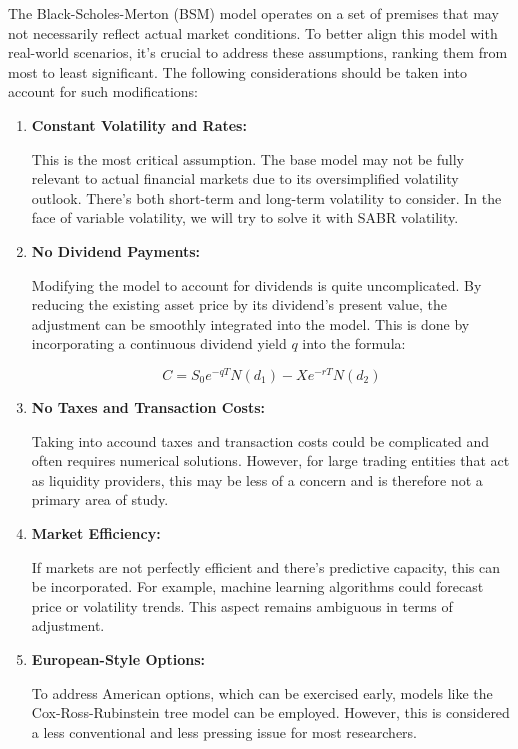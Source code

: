 \documentclass[a4paper,fleqn,12pt]{extarticle}
\begin{document}
	The Black-Scholes-Merton (BSM) model operates on a set of premises that may not necessarily reflect actual market conditions. To better align this model with real-world scenarios, it's crucial to address these assumptions, ranking them from most to least significant. The following considerations should be taken into account for such modifications:
	
	\begin{enumerate}
		\item \textbf{Constant Volatility and Rates:}
		
		This is the most critical assumption. The base model may not be fully relevant to actual financial markets due to its oversimplified volatility outlook. There's both short-term and long-term volatility to consider. In the face of variable volatility, we will try to solve it with SABR volatility.
		
		\item \textbf{No Dividend Payments:}
		
		Modifying the model to account for dividends is quite uncomplicated. By reducing the existing asset price by its dividend's present value, the adjustment can be smoothly integrated into the model. This is done by incorporating a continuous dividend yield $q$ into the formula:
		
		\begin{equation*}
			C = S_0 e^{-qT} N(d_1) - X e^{-rT} N(d_2)
		\end{equation*}
		
		\item \textbf{No Taxes and Transaction Costs:}
		
		Taking into accound taxes and transaction costs could be complicated and often requires numerical solutions. However, for large trading entities that act as liquidity providers, this may be less of a concern and is therefore not a primary area of study.
		
		\item \textbf{Market Efficiency:}
		
		If markets are not perfectly efficient and there's predictive capacity, this can be incorporated. For example, machine learning algorithms could forecast price or volatility trends. This aspect remains ambiguous in terms of adjustment.
		
		\item \textbf{European-Style Options:}
		
		To address American options, which can be exercised early, models like the Cox-Ross-Rubinstein tree model can be employed. However, this is considered a less conventional and less pressing issue for most researchers.
		

\end{enumerate}
\end{document}
